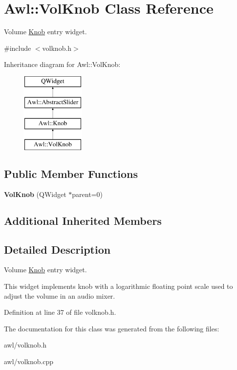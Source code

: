 \hypertarget{class_awl_1_1_vol_knob}{}\section{Awl\+:\+:Vol\+Knob Class Reference}
\label{class_awl_1_1_vol_knob}


Volume \hyperlink{class_awl_1_1_knob}{Knob} entry widget.  




{\ttfamily \#include $<$volknob.\+h$>$}

Inheritance diagram for Awl\+:\+:Vol\+Knob\+:\begin{figure}[H]
\begin{center}
\leavevmode
\includegraphics[height=4.000000cm]{class_awl_1_1_vol_knob}
\end{center}
\end{figure}
\subsection*{Public Member Functions}
\begin{DoxyCompactItemize}
\item 
\mbox{\label{class_awl_1_1_vol_knob_a6391d5a34526b193100f650c3ef367f3}} 
{\bfseries Vol\+Knob} (Q\+Widget $\ast$parent=0)
\end{DoxyCompactItemize}
\subsection*{Additional Inherited Members}


\subsection{Detailed Description}
Volume \hyperlink{class_awl_1_1_knob}{Knob} entry widget. 

This widget implements knob with a logarithmic floating point scale used to adjust the volume in an audio mixer. 

Definition at line 37 of file volknob.\+h.



The documentation for this class was generated from the following files\+:\begin{DoxyCompactItemize}
\item 
awl/volknob.\+h\item 
awl/volknob.\+cpp\end{DoxyCompactItemize}
